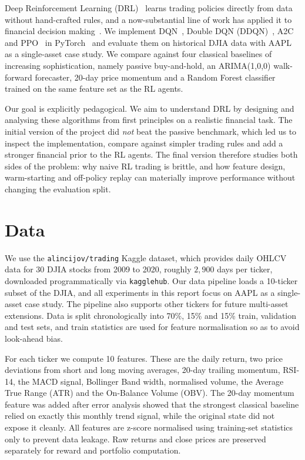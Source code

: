 \documentclass[11pt,twocolumn]{article}
\begin{document}
Deep Reinforcement Learning (DRL)~\cite{mnih2015,sutton2018} learns trading policies directly from data without hand-crafted rules, and a now-substantial line of work has applied it to financial decision making~\cite{moody2001,deng2016,jiang2017,yang2020}. We implement DQN~\cite{mnih2015}, Double DQN (DDQN)~\cite{hasselt2016}, A2C~\cite{mnih2016a3c} and PPO~\cite{schulman2017ppo} in PyTorch~\cite{paszke2019} and evaluate them on historical DJIA data with AAPL as a single-asset case study. We compare against four classical baselines of increasing sophistication, namely passive buy-and-hold, an ARIMA(1,0,0) walk-forward forecaster, 20-day price momentum and a Random Forest classifier trained on the same feature set as the RL agents.

Our goal is explicitly pedagogical. We aim to understand DRL by designing and analysing these algorithms from first principles on a realistic financial task. The initial version of the project did \emph{not} beat the passive benchmark, which led us to inspect the implementation, compare against simpler trading rules and add a stronger financial prior to the RL agents. The final version therefore studies both sides of the problem: why naive RL trading is brittle, and how feature design, warm-starting and off-policy replay can materially improve performance without changing the evaluation split.

\section{Data}

We use the \texttt{alincijov/trading} Kaggle dataset, which provides daily OHLCV data for 30 DJIA stocks from 2009 to 2020, roughly $2{,}900$ days per ticker, downloaded programmatically via \texttt{kagglehub}. Our data pipeline loads a 10-ticker subset of the DJIA, and all experiments in this report focus on AAPL as a single-asset case study. The pipeline also supports other tickers for future multi-asset extensions. Data is split chronologically into 70\%, 15\% and 15\% train, validation and test sets, and train statistics are used for feature normalisation so as to avoid look-ahead bias.

For each ticker we compute 10 features. These are the daily return, two price deviations from short and long moving averages, 20-day trailing momentum, RSI-14, the MACD signal, Bollinger Band width, normalised volume, the Average True Range (ATR) and the On-Balance Volume (OBV). The 20-day momentum feature was added after error analysis showed that the strongest classical baseline relied on exactly this monthly trend signal, while the original state did not expose it cleanly. All features are z-score normalised using training-set statistics only to prevent data leakage. Raw returns and close prices are preserved separately for reward and portfolio computation.
\end{document}
